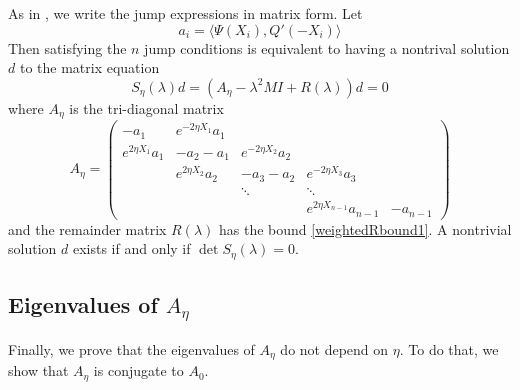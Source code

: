 \documentclass[thesis.tex]{subfiles}
\begin{document}
As in \cite{Sandstede1998}, we write the jump expressions in matrix form. Let 
\[
a_i = \langle \Psi(X_i), Q'(-X_i) \rangle
\]
Then satisfying the $n$ jump conditions is equivalent to having a nontrival solution $d$ to the matrix equation
\[
S_\eta(\lambda)d = (A_\eta - \lambda^2 M I + R(\lambda))d = 0
\]
where $A_\eta$ is the tri-diagonal matrix
\[
A_\eta = \begin{pmatrix}
-a_1 & e^{-2 \eta X_1} a_1 \\
e^{2 \eta X_1} a_1 & -a_2 - a_1 & e^{-2 \eta X_2} a_2 \\
& e^{2 \eta X_2} a_2 & -a_3 - a_2 & e^{-2 \eta X_3} a_3 \\
&& \ddots & \ddots \\
& & & e^{2 \eta X_{n-1}} a_{n-1} & -a_{n-1} 
\end{pmatrix}
\]
and the remainder matrix $R(\lambda)$ has the bound \cref{weightedRbound1}. A nontrivial solution $d$ exists if and only if $\det S_\eta(\lambda) = 0$.

\subsection{Eigenvalues of $A_\eta$}
Finally, we prove that the eigenvalues of $A_\eta$ do not depend on $\eta$. To do that, we show that $A_\eta$ is conjugate to $A_0$.
\end{document}
